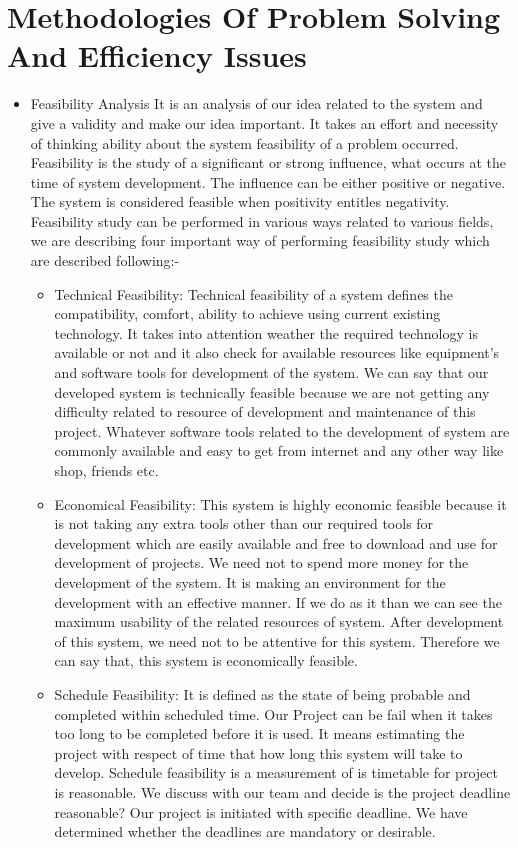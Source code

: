 \documentclass[12pt,a4paper]{report}
\begin{document}
\section{Methodologies Of Problem Solving And Efficiency Issues}
\begin{itemize}
\item	Feasibility Analysis  
It is an analysis of our idea related to the system and give a validity and make our idea important. It takes an effort and necessity of thinking ability about the system feasibility of a problem occurred. Feasibility is the study of a significant or strong influence, what occurs at the time of system development. The influence can be either positive or negative. The system is considered feasible when positivity entitles negativity. Feasibility study can be performed in various ways related to various fields, we are describing four important way of performing feasibility study which are described following:- 
\begin{itemize}
\item	Technical Feasibility: Technical feasibility of a system defines the compatibility, comfort, ability to achieve using current existing technology. It takes into attention weather the required technology is available or not and it also check for available resources like equipment's and software tools for development of the system. We can say that our developed system is technically feasible because we are not getting any difficulty related to resource of development and maintenance of this project. Whatever software tools related to the development of system are commonly available and easy to get from internet and any other way like shop, friends etc. 
\item	 Economical Feasibility: This system is highly economic feasible because it is not taking any extra tools other than our required tools for development which are easily available and free to download and use for development of projects. We need not to spend more money for the development of the system. It is making an environment for the development with an effective manner. If we do as it than we can see the maximum usability of the related resources of system. After development of this system, we need not to be attentive for this system. Therefore we can say that, this system is economically feasible. 
\item	Schedule Feasibility: It is defined as the state of being probable and completed within scheduled time. Our Project can be fail when it takes too long to be completed before it is used. It means estimating the project with respect of time that how long this system will take to develop. Schedule feasibility is a measurement of is timetable for project is reasonable. We discuss with our team and decide is the project deadline reasonable? Our project is initiated with specific deadline. We have determined whether the deadlines are mandatory or desirable. 

\end{itemize}
\end{itemize}
\end{document}
